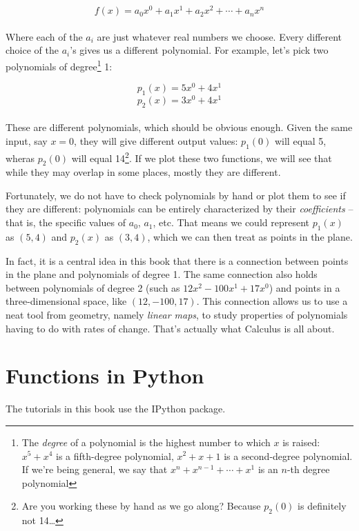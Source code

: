 \[f(x) = a_0 x^0 + a_1 x^1 + a_2 x^2 + \cdots + a_n x^n\]\\

Where each of the $a_i$ are just whatever real numbers we choose. Every different choice of the $a_i$'s gives us a different polynomial. For example, let's pick two polynomials of degree\footnote{The \emph{degree} of a polynomial is the highest number to which $x$ is raised: $x^5 + x^4$ is a fifth-degree polynomial, $x^2 + x + 1$ is a second-degree polynomial. If we're being general, we say that $x^n + x^{n-1} + \cdots + x^1$ is an $n$-th degree polynomial} 1: 

\[p_1(x) = 5 x^0 + 4 x^1\]
\[p_2(x) = 3 x^0 + 4 x^1\]\\

These are different polynomials, which should be obvious enough. Given the same input, say $x=0$, they will give different output values: $p_1(0)$ will equal 5, wheras $p_2(0)$ will equal 14\footnote{Are you working these by hand as we go along? Because $p_2(0)$ is definitely not 14\ldots}. If we plot these two functions, we will see that while they may overlap in some places, mostly they are different. 

Fortunately, we do not have to check polynomials by hand or plot them to see if they are different: polynomials can be entirely characterized by their \emph{coefficients} -- that is, the specific values of $a_0$, $a_1$, etc. That means we could represent $p_1(x)$ as $(5,4)$ and $p_2(x)$ as $(3,4)$, which we can then treat as points in the plane.

In fact, it is a central idea in this book that there is a connection between points in the plane and polynomials of degree 1. The same connection also holds between polynomials of degree 2 (such as $12x^2 - 100x^1 + 17x^0$) and points in a three-dimensional space, like $(12,-100,17)$. This connection allows us to use a neat tool from geometry, namely \emph{linear maps}, to study properties of polynomials having to do with rates of change. That's actually what Calculus is all about.

\section{Functions in Python}
The tutorials in this book use the IPython \cite{PER-GRA:2007} package.

